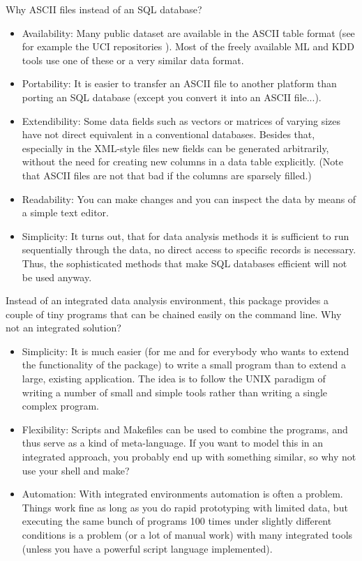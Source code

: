 \documentclass[a4paper]{book}
\begin{document}
Why ASCII files instead of an SQL database?
\begin{itemize}
  
\item Availability: Many public dataset are available in the ASCII
table format (see for example the UCI repositories
\cite{Blake:UCIMLREP:1998,Bay:UCIKDDREP:1999}). Most of the freely
available ML and KDD tools use one of these or a very similar data
format.

\item Portability: It is easier to transfer an ASCII file to another
platform than porting an SQL database (except you convert it into an
ASCII file...).

\item Extendibility: Some data fields such as vectors or matrices of
varying sizes have not direct equivalent in a conventional
databases. Besides that, especially in the XML-style files new fields
can be generated arbitrarily, without the need for creating new
columns in a data table explicitly. (Note that ASCII files are not
that bad if the columns are sparsely filled.)
  
\item Readability: You can make changes and you can inspect the data by means
  of a simple text editor. 
  
\item Simplicity: It turns out, that for data analysis methods it is
sufficient to run sequentially through the data, no direct access
to specific records is necessary. Thus, the sophisticated methods that
make SQL databases efficient will not be used anyway.

\end{itemize}

Instead of an integrated data analysis environment, this package provides a
couple of tiny programs that can be chained easily on the command line. Why
not an integrated solution?
\begin{itemize}

\item Simplicity: It is much easier (for me and for everybody who
wants to extend the functionality of the package) to write a small
program than to extend a large, existing application. The idea is to
follow the UNIX paradigm of writing a number of small and simple tools
rather than writing a single complex program. 

\item Flexibility: Scripts and Makefiles can be used to combine the
programs, and thus serve as a kind of meta-language. If you want to
model this in an integrated approach, you probably end up with
something similar, so why not use your shell and make?

\item Automation: With integrated environments automation is often a
problem.  Things work fine as long as you do rapid prototyping with
limited data, but executing the same bunch of programs 100 times under
slightly different conditions is a problem (or a lot of manual work)
with many integrated tools (unless you have a powerful script language
implemented).
\end{itemize}
\end{document}
